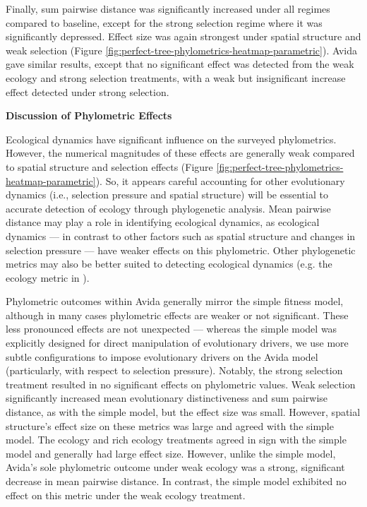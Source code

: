 Finally, sum pairwise distance was significantly increased under all regimes compared to baseline, except for the strong selection regime where it was significantly depressed.
Effect size was again strongest under spatial structure and weak selection (Figure \ref{fig:perfect-tree-phylometrics-heatmap-parametric}).
Avida gave similar results, except that no significant effect was detected from the weak ecology and strong selection treatments, with a weak but insignificant increase effect detected under strong selection.

\noindent
\textbf{Discussion of Phylometric Effects}

\noindent
Ecological dynamics have significant influence on the surveyed phylometrics.
However, the numerical magnitudes of these effects are generally weak compared to spatial structure and selection effects (Figure \ref{fig:perfect-tree-phylometrics-heatmap-parametric}).
So, it appears careful accounting for other evolutionary dynamics (i.e., selection pressure and spatial structure) will be essential to accurate detection of ecology through phylogenetic analysis.
Mean pairwise distance may play a role in identifying ecological dynamics, as ecological dynamics --- in contrast to other factors such as spatial structure and changes in selection pressure --- have weaker effects on this phylometric.
Other phylogenetic metrics may also be better suited to detecting ecological dynamics (e.g. the ecology metric in \citep{dolson2019modes}).

Phylometric outcomes within Avida generally mirror the simple fitness model, although in many cases phylometric effects are weaker or not significant.
These less pronounced effects are not unexpected --- whereas the simple model was explicitly designed for direct manipulation of evolutionary drivers, we use more subtle configurations to impose evolutionary drivers on the Avida model (particularly, with respect to selection pressure).
Notably, the strong selection treatment resulted in no significant effects on phylometric values.
Weak selection significantly increased mean evolutionary distinctiveness and sum pairwise distance, as with the simple model, but the effect size was small.
However, spatial structure's effect size on these metrics was large and agreed with the simple model.
The ecology and rich ecology treatments agreed in sign with the simple model and generally had large effect size.
However, unlike the simple model, Avida's sole phylometric outcome under weak ecology was a strong, significant decrease in mean pairwise distance.
In contrast, the simple model exhibited no effect on this metric under the weak ecology treatment.

